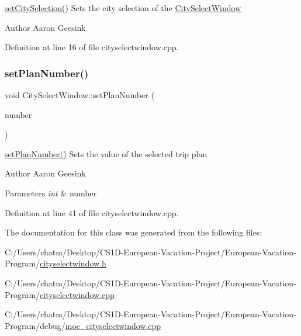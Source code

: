 \mbox{\hyperlink{class_city_select_window_a771b0feebb7c7fdb1714917b337a37f3}{set\+City\+Selection()}} Sets the city selection of the \mbox{\hyperlink{class_city_select_window}{City\+Select\+Window}} 

\begin{DoxyAuthor}{Author}
Aaron Geesink 
\end{DoxyAuthor}


Definition at line 16 of file cityselectwindow.\+cpp.

\mbox{\label{class_city_select_window_a6afffce8400f9541a3c31e0e359c0d9b}} 
\subsubsection{\texorpdfstring{setPlanNumber()}{setPlanNumber()}}
{\footnotesize\ttfamily void City\+Select\+Window\+::set\+Plan\+Number (\begin{DoxyParamCaption}\item[{int}]{number }\end{DoxyParamCaption})}



\mbox{\hyperlink{class_city_select_window_a6afffce8400f9541a3c31e0e359c0d9b}{set\+Plan\+Number()}} Sets the value of the selected trip plan 

\begin{DoxyAuthor}{Author}
Aaron Geesink 
\end{DoxyAuthor}

\begin{DoxyParams}{Parameters}
{\em int} & number \\
\hline
\end{DoxyParams}


Definition at line 41 of file cityselectwindow.\+cpp.



The documentation for this class was generated from the following files\+:\begin{DoxyCompactItemize}
\item 
C\+:/\+Users/chatm/\+Desktop/\+C\+S1\+D-\/\+European-\/\+Vacation-\/\+Project/\+European-\/\+Vacation-\/\+Program/\mbox{\hyperlink{cityselectwindow_8h}{cityselectwindow.\+h}}\item 
C\+:/\+Users/chatm/\+Desktop/\+C\+S1\+D-\/\+European-\/\+Vacation-\/\+Project/\+European-\/\+Vacation-\/\+Program/\mbox{\hyperlink{cityselectwindow_8cpp}{cityselectwindow.\+cpp}}\item 
C\+:/\+Users/chatm/\+Desktop/\+C\+S1\+D-\/\+European-\/\+Vacation-\/\+Project/\+European-\/\+Vacation-\/\+Program/debug/\mbox{\hyperlink{moc__cityselectwindow_8cpp}{moc\+\_\+cityselectwindow.\+cpp}}\end{DoxyCompactItemize}
